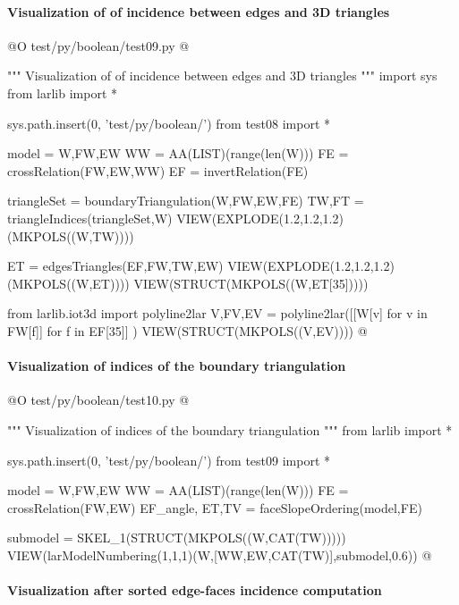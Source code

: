 \documentclass[11pt,oneside]{article}    %
\begin{document}
\paragraph{Visualization of of incidence between edges and 3D triangles}

@O test/py/boolean/test09.py @{
""" Visualization of of incidence between edges and 3D triangles """
import sys
from larlib import *

sys.path.insert(0, 'test/py/boolean/')
from test08 import *

model = W,FW,EW
WW = AA(LIST)(range(len(W)))
FE = crossRelation(FW,EW,WW)
EF = invertRelation(FE)

triangleSet = boundaryTriangulation(W,FW,EW,FE)
TW,FT = triangleIndices(triangleSet,W)
VIEW(EXPLODE(1.2,1.2,1.2)(MKPOLS((W,TW))))

ET = edgesTriangles(EF,FW,TW,EW)
VIEW(EXPLODE(1.2,1.2,1.2)(MKPOLS((W,ET))))
VIEW(STRUCT(MKPOLS((W,ET[35]))))

from larlib.iot3d import polyline2lar
V,FV,EV = polyline2lar([[W[v] for v in FW[f]] for f in EF[35]] )
VIEW(STRUCT(MKPOLS((V,EV))))
@}



\paragraph{Visualization of indices of the boundary triangulation}

@O test/py/boolean/test10.py @{
""" Visualization of indices of the boundary triangulation """
from larlib import *

sys.path.insert(0, 'test/py/boolean/')
from test09 import *

model = W,FW,EW
WW = AA(LIST)(range(len(W)))
FE = crossRelation(FW,EW)
EF_angle, ET,TV = faceSlopeOrdering(model,FE)

submodel = SKEL_1(STRUCT(MKPOLS((W,CAT(TW)))))
VIEW(larModelNumbering(1,1,1)(W,[WW,EW,CAT(TW)],submodel,0.6))
@}


\paragraph{Visualization after sorted edge-faces incidence computation}
\end{document}
